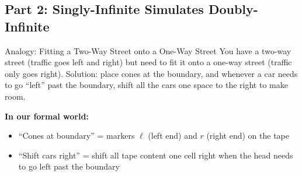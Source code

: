 \documentclass[11pt,a4paper]{article}
\begin{document}
\subsection{Part 2: Singly-Infinite Simulates Doubly-Infinite}

\begin{notebox}{Analogy: Fitting a Two-Way Street onto a One-Way Street}
You have a two-way street (traffic goes left and right) but need to fit it onto a one-way street (traffic only goes right). Solution: place cones at the boundary, and whenever a car needs to go ``left'' past the boundary, shift all the cars one space to the right to make room.

\textbf{In our formal world:}
\begin{itemize}[nosep]
\item ``Cones at boundary'' = markers $\ell$ (left end) and $r$ (right end) on the tape
\item ``Shift cars right'' = shift all tape content one cell right when the head needs to go left past the boundary
\end{itemize}
\end{notebox}
\end{document}
